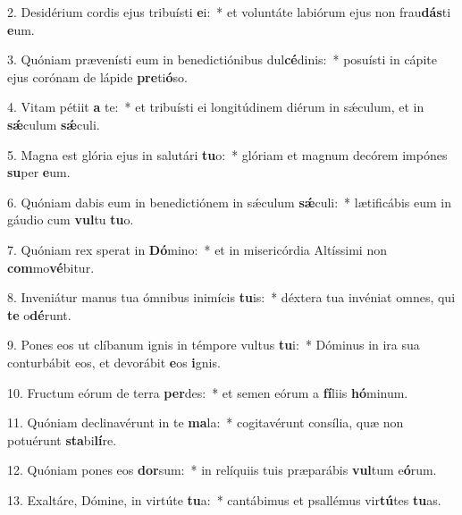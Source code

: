 2. Desidérium cordis ejus tribuísti \textbf{e}i:~*  et voluntáte labiórum ejus non frau\textbf{dás}ti \textbf{e}um.\

3. Quóniam prævenísti eum in benedictiónibus dul\textbf{cé}dinis:~*  posuísti in cápite ejus corónam de lápide \textbf{pre}ti\textbf{ó}so.\

4. Vitam pétiit \textbf{a} te:~*  et tribuísti ei longitúdinem diérum in sǽculum, et in \textbf{sǽ}culum \textbf{sǽ}culi.\

5. Magna est glória ejus in salutári \textbf{tu}o:~*  glóriam et magnum decórem impónes \textbf{su}per \textbf{e}um.\

6. Quóniam dabis eum in benedictiónem in sǽculum \textbf{sǽ}culi:~*  lætificábis eum in gáudio cum \textbf{vul}tu \textbf{tu}o.\

7. Quóniam rex sperat in \textbf{Dó}mino:~*  et in misericórdia Altíssimi non \textbf{com}mo\textbf{vé}bitur.\

8. Inveniátur manus tua ómnibus inimícis \textbf{tu}is:~*  déxtera tua invéniat omnes, qui \textbf{te} o\textbf{dé}runt.\

9. Pones eos ut clíbanum ignis in témpore vultus \textbf{tu}i:~*  Dóminus in ira sua conturbábit eos, et devorábit \textbf{e}os \textbf{i}gnis.\

10. Fructum eórum de terra \textbf{per}des:~*  et semen eórum a \textbf{fí}liis \textbf{hó}minum.\

11. Quóniam declinavérunt in te \textbf{ma}la:~*  cogitavérunt consília, quæ non potuérunt \textbf{sta}bi\textbf{lí}re.\

12. Quóniam pones eos \textbf{dor}sum:~*  in relíquiis tuis præparábis \textbf{vul}tum e\textbf{ó}rum.\

13. Exaltáre, Dómine, in virtúte \textbf{tu}a:~*  cantábimus et psallémus vir\textbf{tú}tes \textbf{tu}as.\

